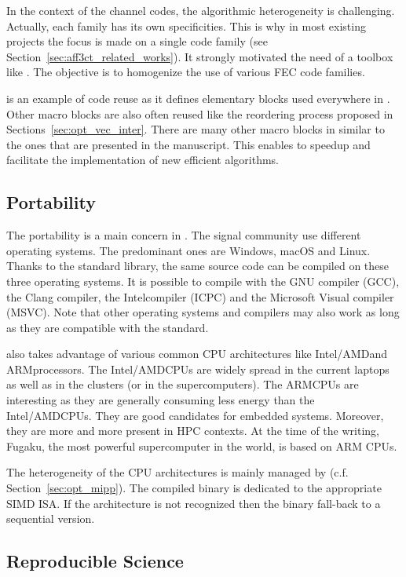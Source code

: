 In the context of the channel codes, the algorithmic heterogeneity is
challenging. Actually, each family has its own specificities. This is why in
most existing projects the focus is made on a single code family (see
Section~\ref{sec:aff3ct_related_works}). It strongly motivated the need of a
toolbox like \AFFECT. The objective is to homogenize the use of various FEC code
families.

\MIPP is an example of code reuse as it defines elementary blocks used
everywhere in \AFFECT. Other macro blocks are also often reused like the
reordering process proposed in Sections~\ref{sec:opt_vec_inter}. There are many
other macro blocks in \AFFECT similar to the ones that are presented in the
manuscript. This enables to speedup and facilitate the implementation of new
efficient algorithms.

\subsection{Portability}

The portability is a main concern in \AFFECT. The signal community use different
operating systems. The predominant ones are Windows, macOS and Linux. Thanks to
the  standard library, the same \AFFECT source code can be compiled on
these three operating systems. It is possible to compile with the GNU compiler
(GCC), the Clang compiler, the Intel\R \Cxx compiler (ICPC) and the Microsoft\R
Visual compiler (MSVC). Note that other operating systems and compilers may also
work as long as they are compatible with the  standard.

\AFFECT also takes advantage of various common CPU architectures like
Intel\R/AMD\R and ARM\R processors. The Intel\R/AMD\R CPUs are widely spread
in the current laptops as well as in the clusters (or in the supercomputers).
The ARM\R CPUs are interesting as they are generally consuming less energy than
the Intel\R/AMD\R CPUs. They are good candidates for embedded systems. Moreover,
they are more and more present in HPC contexts. At the time of the writing,
Fugaku, the most powerful supercomputer in the world, is based on ARM CPUs.

The heterogeneity of the CPU architectures is mainly managed by \MIPP (c.f.
Section~\ref{sec:opt_mipp}). The compiled binary is dedicated to the appropriate
SIMD ISA. If the architecture is not recognized then the \AFFECT binary
fall-back to a sequential version.

\subsection{Reproducible Science}


